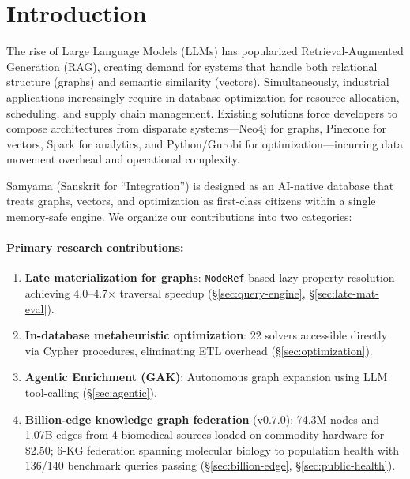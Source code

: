 \documentclass[11pt]{article}
\begin{document}
\section{Introduction}

The rise of Large Language Models (LLMs) has popularized Retrieval-Augmented Generation (RAG), creating demand for systems that handle both relational structure (graphs) and semantic similarity (vectors). Simultaneously, industrial applications increasingly require in-database optimization for resource allocation, scheduling, and supply chain management. Existing solutions force developers to compose architectures from disparate systems---Neo4j for graphs, Pinecone for vectors, Spark for analytics, and Python/Gurobi for optimization---incurring data movement overhead and operational complexity.

Samyama (Sanskrit for ``Integration'') is designed as an AI-native database that treats graphs, vectors, and optimization as first-class citizens within a single memory-safe engine. We organize our contributions into two categories:

\paragraph{Primary research contributions:}
\begin{enumerate}[leftmargin=*]
  \item \textbf{Late materialization for graphs}: \texttt{NodeRef}-based lazy property resolution~\citep{abadi2008column} achieving 4.0--4.7$\times$ traversal speedup (\S\ref{sec:query-engine}, \S\ref{sec:late-mat-eval}).
  \item \textbf{In-database metaheuristic optimization}: 22 solvers accessible directly via Cypher procedures, eliminating ETL overhead (\S\ref{sec:optimization}).
  \item \textbf{Agentic Enrichment (GAK)}: Autonomous graph expansion using LLM tool-calling (\S\ref{sec:agentic}).
  \item \textbf{Billion-edge knowledge graph federation} (v0.7.0): 74.3M nodes and 1.07B edges from 4 biomedical sources loaded on commodity hardware for \$2.50; 6-KG federation spanning molecular biology to population health with 136/140 benchmark queries passing (\S\ref{sec:billion-edge}, \S\ref{sec:public-health}).
\end{enumerate}
\end{document}
